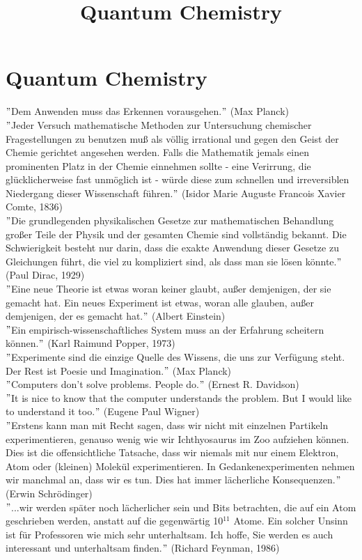 \documentclass[9pt]{report}
\title{\Huge\textbf{Quantum Chemistry}}
\date{}
\author{}
\begin{document}
\maketitle


\tableofcontents

\newpage
\chapter{Quantum Chemistry}
$"$Dem Anwenden muss das Erkennen vorausgehen.$"$ (Max Planck)\\
$"$Jeder Versuch mathematische Methoden zur Untersuchung chemischer Fragestellungen zu benutzen muß als völlig irrational und gegen den Geist der Chemie gerichtet angesehen werden. Falls die Mathematik jemals einen prominenten Platz in der Chemie einnehmen sollte - eine Verirrung, die glücklicherweise fast unmöglich ist - würde diese zum schnellen und irreversiblen Niedergang dieser Wissenschaft führen.$"$ (Isidor Marie Auguste Francois Xavier Comte, 1836)\\
$"$Die grundlegenden physikalischen Gesetze zur mathematischen Behandlung großer Teile der Physik und der gesamten Chemie sind vollständig bekannt. Die Schwierigkeit besteht nur darin, dass die exakte Anwendung dieser Gesetze zu Gleichungen führt, die viel zu kompliziert sind, als dass man sie lösen könnte.$"$ (Paul Dirac, 1929)\\
$"$Eine neue Theorie ist etwas woran keiner glaubt, außer demjenigen, der sie gemacht hat. Ein neues Experiment ist etwas, woran alle glauben, außer demjenigen, der es gemacht hat.$"$ (Albert Einstein)\\
$"$Ein empirisch-wissenschaftliches System muss an der Erfahrung scheitern können.$"$ (Karl Raimund Popper, 1973)\\
$"$Experimente sind die einzige Quelle des Wissens, die uns zur Verfügung steht. Der Rest ist Poesie und Imagination.$"$ (Max Planck)\\
$"$Computers don't solve problems. People do.$"$ (Ernest R. Davidson)\\
$"$It is nice to know that the computer understands the problem. But I would like to understand it too.$"$ (Eugene Paul Wigner)\\
$"$Erstens kann man mit Recht sagen, dass wir nicht mit einzelnen Partikeln experimentieren, genauso wenig wie wir Ichthyosaurus im Zoo aufziehen können. Dies ist die offensichtliche Tatsache, dass wir niemals mit nur einem Elektron, Atom oder (kleinen) Molekül experimentieren. In Gedankenexperimenten nehmen wir manchmal an, dass wir es tun. Dies hat immer lächerliche Konsequenzen.$"$ (Erwin Schrödinger)\\
$"$...wir werden später noch lächerlicher sein und Bits betrachten, die auf ein Atom geschrieben werden, anstatt auf die gegenwärtig 10$^{11}$ Atome. Ein solcher Unsinn ist für Professoren wie mich sehr unterhaltsam. Ich hoffe, Sie werden es auch interessant und unterhaltsam finden.$"$ (Richard Feynman, 1986)
\end{document}
